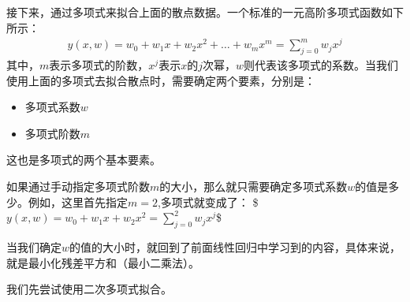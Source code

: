 \documentclass[letterpaper,10pt,english]{sphinxmanual}
\begin{document}
\noindent{}

接下来，通过多项式来拟合上面的散点数据。一个标准的一元高阶多项式函数如下所示：
\begin{equation*}
\begin{split}
y(x, w)=w_{0}+w_{1} x+w_{2} x^{2}+\ldots+w_{m} x^{m}=\sum_{j=0}^{m} w_{j} x^{j}
\end{split}
\end{equation*}
其中，\(m\)表示多项式的阶数，\(x^j\)表示\(x\)的\(j\)次幂，\(w\)则代表该多项式的系数。当我们使用上面的多项式去拟合散点时，需要确定两个要素，分别是：
\begin{itemize}
\item {} 
多项式系数\(w\)

\item {} 
多项式阶数\(m\)

\end{itemize}

这也是多项式的两个基本要素。

如果通过手动指定多项式阶数\(m\)的大小，那么就只需要确定多项式系数\(w\)的值是多少。例如，这里首先指定\(m=2\),多项式就变成了：
\$\(
y(x, w)=w_{0}+w_{1} x+w_{2} x^{2}=\sum_{j=0}^{2} w_{j} x^{j}
\)\$

当我们确定\(w\)的值的大小时，就回到了前面线性回归中学习到的内容，具体来说，就是最小化残差平方和（最小二乘法）。

我们先尝试使用二次多项式拟合。
\end{document}
